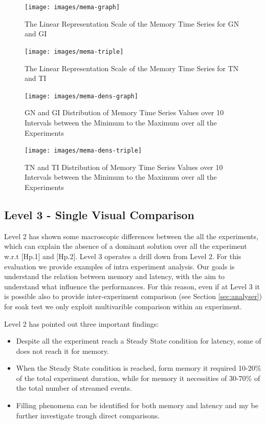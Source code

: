 \begin{figure}[hbt]
  \centering
	\texttt{[image: images/mema-graph]}
	\caption{The Linear Representation Scale of the Memory Time Series for GN and GI} 
  	\label{fig:level2-memory-graph}
\end{figure}

\begin{figure}[hbt]
  \centering
	\texttt{[image: images/mema-triple]}
	\caption{The Linear Representation Scale of the Memory Time Series for TN and TI} 
  	\label{fig:level2-memory-triple}
\end{figure}

\begin{figure}[hbt]
  \centering
	\texttt{[image: images/mema-dens-graph]}
	\caption{GN and GI Distribution of Memory Time Series Values over 10 Intervals between the Minimum to the Maximum over all the Experiments} 
  	\label{fig:level2-memory-density-graph}
\end{figure}

\begin{figure}[hbt]
  \centering
	\texttt{[image: images/mema-dens-triple]}
	\caption{TN and TI Distribution of Memory Time Series Values over 10 Intervals between the Minimum to the Maximum over all the Experiments} 
  	\label{fig:level2-memory-density-triple}
\end{figure}

\subsection{Level 3 - Single Visual Comparison}\label{sec:eval-level3}
	
Level 2 has shown some macroscopic differences between the all the experiments, which can explain the absence of a dominant solution over all the experiment w.r.t [Hp.1] and [Hp.2]. Level 3 operates a drill down from Level 2. For this evaluation we provide examples of intra experiment analysis. Our goals is understand the relation between memory and latency, with the aim to understand what influence the performances. For this reason, even if at Level 3 it is possible also to provide inter-experiment comparison (see Section \ref{sec:analyser}) for soak test we only exploit multivarible comparison within an experiment.

Level 2 has pointed out three important findings:
\begin{itemize}
\item Despite all the experiment reach a Steady State condition for latency, some of does not reach it for memory.
\item When the Steady State condition is reached, form memory it required 10-20\% of the total experiment duration, while for memory it necessities of 30-70\% of the total number of streamed events.
\item Filling phenomena can be identified for both memory and latency and my be further investigate trough direct comparisons.
\end{itemize}

